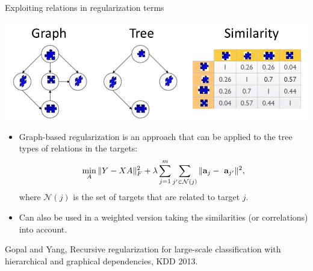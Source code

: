 \begin{frame}{Exploiting relations in regularization terms}
	\footnotesize
%
	\begin{center}
		\includegraphics[width=\textwidth]{figure/targetrelations}
	\end{center} 
%	
	\begin{itemize}
%		
		\item 	Graph-based regularization is an approach that can be applied to the tree types of relations in the targets: 
		\begin{equation*}
			\min_A \|Y - XA \|^2_F + \lambda \sum_{j=1}^m \sum_{j' \in \mathcal{N}(j)} \|\mathbf{a}_j - \ \mathbf{a}_{j'}\|^2,
		\end{equation*}
		where $\mathcal{N}(j)$ is the set of targets that are related to target $j.$
%		
		\item Can also be used in a weighted version taking the similarities (or correlations) into account.
%		
	\end{itemize}
	
%
	{\tiny Gopal and Yang, Recursive regularization for large-scale classification with hierarchical and graphical dependencies, KDD 2013.}
\end{frame}

